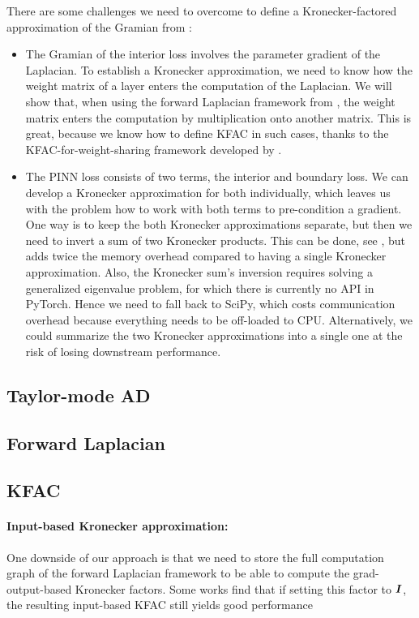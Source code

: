 There are some challenges we need to overcome to define a Kronecker-factored approximation of the Gramian from :
\begin{itemize}
\item The Gramian of the interior loss involves the parameter gradient of the Laplacian. To establish a Kronecker approximation, we need to know how the weight matrix of a layer enters the computation of the Laplacian. We will show that, when using the forward Laplacian framework from \cite{li2023forward}, the weight matrix enters the computation by multiplication onto another matrix. This is great, because we know how to define KFAC in such cases, thanks to the KFAC-for-weight-sharing framework developed by \citet{eschenhagen2023kroneckerfactored}.

\item The PINN loss consists of two terms, the interior and boundary loss.
  We can develop a Kronecker approximation for both individually, which leaves us with the problem how to work with both terms to pre-condition a gradient.
  One way is to keep the both Kronecker approximations separate, but then we need to invert a sum of two Kronecker products.
  This can be done, see , but adds twice the memory overhead compared to having a single Kronecker approximation.
  Also, the Kronecker sum's inversion requires solving a generalized eigenvalue problem, for which there is currently no API in PyTorch.
  Hence we need to fall back to SciPy, which costs communication overhead because everything needs to be off-loaded to CPU.
  Alternatively, we could summarize the two Kronecker approximations into a single one at the risk of losing downstream performance.
\end{itemize}

\subsection{Taylor-mode AD}
\subsection{Forward Laplacian}
\subsection{KFAC}

\paragraph{Input-based Kronecker approximation:} One downside of our approach is that we need to store the full computation graph of the forward Laplacian framework to be able to compute the grad-output-based Kronecker factors.
Some works find that if setting this factor to ${\bm{I}}$, the resulting input-based KFAC still yields good performance~\cite{benzing2022gradient,petersen2023isaac}

